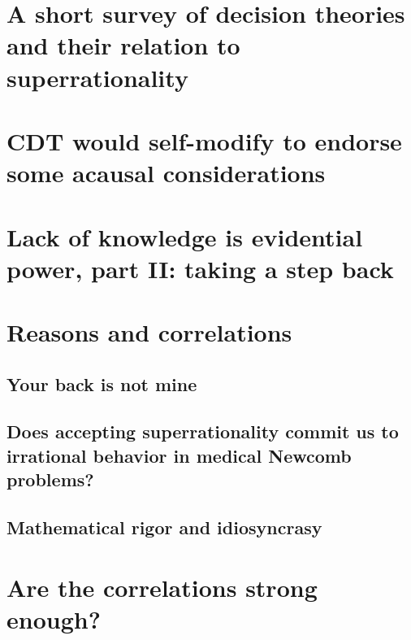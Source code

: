 \documentclass{book}
\begin{document}
\newpage

\section{A short survey of decision theories and their relation to superrationality}
\label{A short survey of decision theories and their relation to superrationality}

\section{CDT would self-modify to endorse some acausal considerations}
\label{CDT would self-modify to endorse some acausal considerations}

\section{Lack of knowledge is evidential power, part II: taking a step back} 
\label{Lack of knowledge is evidential power, part II: taking a step back}

\section{Reasons and correlations}
\label{Reasons and correlations}

\subsection{Your back is not mine}
\label{Your back is not mine}

\subsection{Does accepting superrationality commit us to irrational behavior in medical Newcomb problems?}
\label{Does accepting superrationality commit us to irrational behavior in medical Newcomb problems?}

\subsection{Mathematical rigor and idiosyncrasy}
\label{Mathematical rigor and idiosyncrasy}

\section{Are the correlations strong enough?}
\label{Are the correlations strong enough?}
\end{document}
